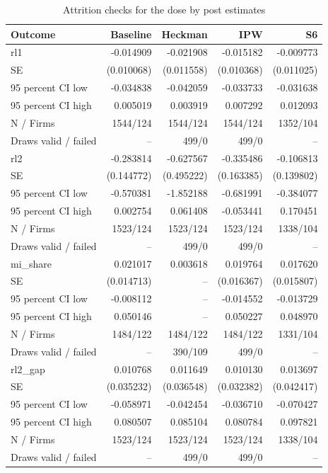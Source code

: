 \begin{table}[htbp]
\centering\small
\caption{Attrition checks for the dose by post estimates}
\label{tab:selection}
\begin{tabular}{lrrrr}
\toprule
Outcome & Baseline & Heckman & IPW & S6 \\
\midrule
rl1 & -0.014909 & -0.021908 & -0.015182 & -0.009773 \\
SE & (0.010068) & (0.011558) & (0.010368) & (0.011025) \\
95 percent CI low & -0.034838 & -0.042059 & -0.033733 & -0.031638 \\
95 percent CI high & 0.005019 & 0.003919 & 0.007292 & 0.012093 \\
N / Firms & 1544/124 & 1544/124 & 1544/124 & 1352/104 \\
Draws valid / failed & -- & 499/0 & 499/0 & -- \\
rl2 & -0.283814 & -0.627567 & -0.335486 & -0.106813 \\
SE & (0.144772) & (0.495222) & (0.163385) & (0.139802) \\
95 percent CI low & -0.570381 & -1.852188 & -0.681991 & -0.384077 \\
95 percent CI high & 0.002754 & 0.061408 & -0.053441 & 0.170451 \\
N / Firms & 1523/124 & 1523/124 & 1523/124 & 1338/104 \\
Draws valid / failed & -- & 499/0 & 499/0 & -- \\
mi\_share & 0.021017 & 0.003618 & 0.019764 & 0.017620 \\
SE & (0.014713) & -- & (0.016367) & (0.015807) \\
95 percent CI low & -0.008112 & -- & -0.014552 & -0.013729 \\
95 percent CI high & 0.050146 & -- & 0.050227 & 0.048970 \\
N / Firms & 1484/122 & 1484/122 & 1484/122 & 1331/104 \\
Draws valid / failed & -- & 390/109 & 499/0 & -- \\
rl2\_gap & 0.010768 & 0.011649 & 0.010130 & 0.013697 \\
SE & (0.035232) & (0.036548) & (0.032382) & (0.042417) \\
95 percent CI low & -0.058971 & -0.042454 & -0.036710 & -0.070427 \\
95 percent CI high & 0.080507 & 0.085104 & 0.080784 & 0.097821 \\
N / Firms & 1523/124 & 1523/124 & 1523/124 & 1338/104 \\
Draws valid / failed & -- & 499/0 & 499/0 & -- \\

\end{tabular}
\end{table}
